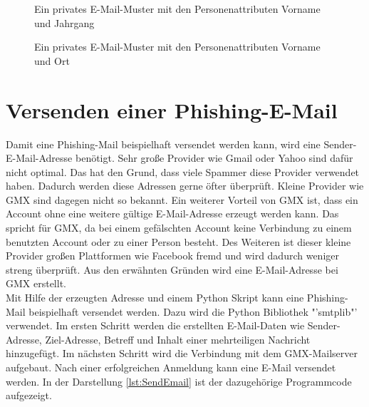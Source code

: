			\begin{figure}[h!]
				\label{img:VornameJahrgang}
				\caption{Ein privates E-Mail-Muster mit den Personenattributen Vorname und Jahrgang}
			\end{figure}
		
			\begin{figure}[h!]
				\caption{Ein privates E-Mail-Muster mit den Personenattributen Vorname und Ort}
			\end{figure}
		
		\FloatBarrier
\section{Versenden einer Phishing-E-Mail}
Damit eine Phishing-Mail beispielhaft versendet werden kann, wird eine Sender-E-Mail-Adresse benötigt. Sehr große Provider wie Gmail oder Yahoo sind dafür nicht optimal. Das hat den Grund, dass viele Spammer diese Provider verwendet haben. Dadurch werden diese Adressen gerne öfter überprüft. Kleine Provider wie GMX sind dagegen nicht so bekannt. Ein weiterer Vorteil von GMX ist, dass ein Account ohne eine weitere gültige E-Mail-Adresse erzeugt werden kann. Das spricht für GMX, da bei einem gefälschten Account keine Verbindung zu einem benutzten Account oder zu einer Person besteht. Des Weiteren ist dieser kleine Provider großen Plattformen wie Facebook fremd und wird dadurch weniger streng überprüft.\cite{Bazzell} Aus den erwähnten Gründen wird eine E-Mail-Adresse bei GMX erstellt.\\
Mit Hilfe der erzeugten Adresse und einem Python Skript kann eine Phishing-Mail beispielhaft versendet werden. Dazu wird die Python Bibliothek "'smtplib"' verwendet. Im ersten Schritt werden die erstellten E-Mail-Daten wie Sender-Adresse, Ziel-Adresse, Betreff und Inhalt einer mehrteiligen Nachricht hinzugefügt. Im nächsten Schritt wird die Verbindung mit dem GMX-Mailserver aufgebaut. Nach einer erfolgreichen Anmeldung kann eine E-Mail versendet werden. In der Darstellung \ref{lst:SendEmail} ist der dazugehörige Programmcode aufgezeigt.\\

